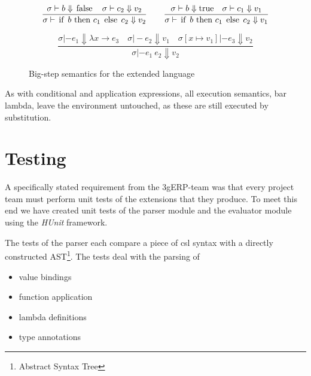 \documentclass[10pt,a4paper,final,oneside,openany,article]{memoir}
\newcommand{\kw}[1]{\text{\lstinline{#1}}}
\begin{document}
\begin{figure}
\begin{equation*}
\frac{
  \sigma |- b \Downarrow \kw{false}
  \quad \sigma |- c_2 \Downarrow v_2
}{
  \sigma |- \kw{if} ~b ~\kw{then} ~c_1 ~\kw{else} ~c_2 \Downarrow v_2
}
\quad \quad
\frac{
  \sigma |- b \Downarrow \kw{true}
  \quad \sigma |- c_1 \Downarrow v_1
}{
  \sigma |- \kw{if} ~b ~\kw{then} ~c_1 ~\kw{else} ~c_2 \Downarrow v_1
}\label{eq:eval_condition}
\end{equation*}

\begin{equation*}
\frac{
  \sigma |- e_1 \Downarrow \lambda x \rightarrow e_3
  \quad \sigma |- e_2 \Downarrow v_1
  \quad \sigma[x\mapsto v_1] |- e_3 \Downarrow v_2
}{
  \sigma |- e_1 ~e_2 \Downarrow v_2
}\label{eq:eval_apply}
\end{equation*}

\caption{Big-step semantics for the extended language}
\label{fig:bigstep_semantics}
\end{figure}

As with conditional and application expressions, all execution
semantics, bar lambda, leave the environment untouched, as these are
still executed by substitution.


\section{Testing}
A specifically stated requirement from the 3gERP-team was that every
project team must perform unit tests of the extensions that they
produce. To meet this end we have created unit tests of the parser
module and the evaluator module using the \emph{HUnit} framework.

The tests of the parser each compare a piece of csl syntax with a
directly constructed AST\footnote{Abstract Syntax Tree}.  The tests
deal with the parsing of

\begin{itemize}

  \item value bindings

  \item function application

  \item lambda definitions

  \item type annotations

\end{itemize}
\end{document}
